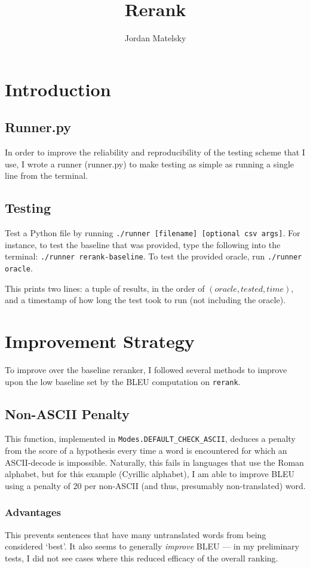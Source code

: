 \documentclass{article}
\title{Rerank}
\author{Jordan Matelsky}
\begin{document}
\maketitle

\section{Introduction}

\subsection{Runner.py}
In order to improve the reliability and reproducibility of the testing scheme that I use, I wrote a runner (runner.py) to make testing as simple as running a single line from the terminal.

\subsection{Testing}
Test a Python file by running \texttt{./runner [filename] [optional csv args]}. For instance, to test the baseline that was provided, type the following into the terminal: \texttt{./runner rerank-baseline}. To test the provided oracle, run \texttt{./runner oracle}.

This prints two lines: a tuple of results, in the order of $(oracle, tested, time)$, and a timestamp of how long the test took to run (not including the oracle).

\section{Improvement Strategy}
To improve over the baseline reranker, I followed several methods to improve upon the low baseline set by the BLEU computation on \texttt{rerank}.

\subsection{Non-ASCII Penalty}
This function, implemented in \texttt{Modes.DEFAULT_CHECK_ASCII}, deduces a penalty from the score of a hypothesis every time a word is encountered for which an ASCII-decode is impossible. Naturally, this fails in languages that use the Roman alphabet, but for this example (Cyrillic alphabet), I am able to improve BLEU using a penalty of 20 per non-ASCII (and thus, presumably non-translated) word.

\subsubsection{Advantages}
This prevents sentences that have many untranslated words from being considered `best'. It also seems to generally \textit{improve} BLEU — in my preliminary tests, I did not see cases where this reduced efficacy of the overall ranking.
\end{document}
